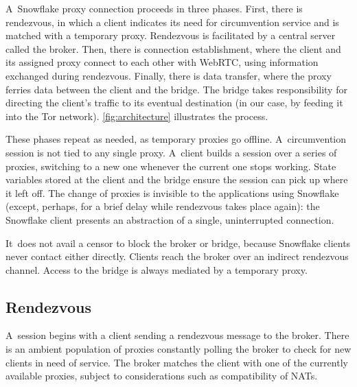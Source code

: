 \documentclass[letterpaper,twocolumn]{article}
\begin{document}
A~Snowflake proxy connection proceeds in three phases.
First, there is rendezvous, in which a client
indicates its need for circumvention service
and is matched with a temporary proxy.
Rendezvous is facilitated by a central server called the broker.
Then, there is connection establishment,
where the client and its assigned proxy connect to each other
with WebRTC, using information exchanged during rendezvous.
Finally, there is data transfer,
where the proxy ferries data
between the client and the bridge.
The bridge takes responsibility for directing the client's traffic
to its eventual destination
(in our case, by feeding it into the Tor network).
\autoref{fig:architecture} illustrates the process.

These phases repeat as needed, as temporary proxies go offline.
A~circumvention session is not tied to any single proxy.
A~client builds a session over
a series of proxies, switching to a new one
whenever the current one stops working.
State variables stored at the client and the bridge
ensure the session can pick up where it left off.
The change of proxies is invisible to the applications using Snowflake
(except, perhaps, for a brief delay while rendezvous takes place again):
the Snowflake client presents an abstraction of a single, uninterrupted connection.

It~does not avail a censor to block the broker or bridge,
because Snowflake clients never contact either directly.
Clients reach the broker over an indirect rendezvous channel.
Access to the bridge is always mediated by a temporary proxy.

\subsection{Rendezvous}
\label{sec:rendezvous}

A~session begins with a client sending a rendezvous message to the broker.
There is an ambient population of proxies
constantly polling the broker to check for new clients in need of service.
The broker matches the client with one of the currently available proxies,
subject to considerations such as compatibility of NATs.
\end{document}
